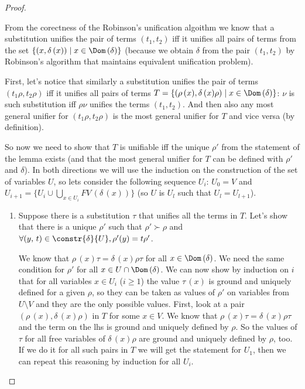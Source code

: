 \begin{proof} $ $

From the corectness of the Robinson's unification algoithm we know that a substitution unifies the pair of terms $(t_1, t_2)$ iff it unifies all pairs of terms from the set $\{ (x, \delta\,(x)) \mid x \in \Dom\,(\delta) \}$ (because we obtain $\delta$ from the pair $(t_1, t_2)$ by Robinson's algorithm that maintains equivalent unification problem).

First, let's notice that similarly a substitution unifies the pair of terms $(t_1 \rho, t_2 \rho)$ iff it unifies all pairs of terms  $T = \{ (\rho\,(x), \delta\,(x) \rho) \mid x \in \Dom\,(\delta) \}$: $\nu$ is such substitution iff $\rho \nu$ unifies the terms $(t_1, t_2)$. And then also any most general unifier for $(t_1 \rho, t_2 \rho)$ is the most general unifier for $T$ and vice versa (by definition).

So now we need to show that $T$ is unifiable iff the unique $\rho'$ from the statement of the lemma exists (and that the most general unifier for $T$ can be defined with $\rho'$ and $\delta$). In both directions we will use the induction on the construction of the set of variables $U$, so lets consider the following sequence $U_i$: $U_0 = V$ and $U_{i+1} = \{ U_i \cup \bigcup\limits_{x \in U_{i}} FV\,(\delta\,(x)) \}$ (so $U$ is $U_l$ such that $U_l = U_{l + 1}$).

\begin{enumerate}
\item Suppose there is a substitution $\tau$ that unifies all the terms in $T$. Let's show that there is a unique $\rho'$ such that $\rho' \succ \rho$ and $\forall (y, \, t) \in \constr{\delta}{U}, \\ \rho'(y) = t \rho'$.

We know that $\rho\,(x) \tau = \delta\,(x) \rho \tau$ for all $x \in \Dom\,(\delta)$. We need the same condition for $\rho'$ for all $x \in U \cap \Dom\,(\delta)$. We can now show by induction on $i$ that for all variables $x \in U_i$ ($i \ge 1$) the value $\tau\,(x)$ is ground and uniquely defined for a given $\rho$, so they can be taken as values of $\rho'$ on variables from $U \setminus V$ and they are the only possible values. First, look at a pair $(\rho\,(x), \delta\,(x) \rho)$ in $T$ for some $x \in V$. We know that $\rho\,(x) \tau = \delta\,(x) \rho \tau$ and the term on the lhs is ground and uniquely defined by $\rho$. So the values of $\tau$ for all free variables of $\delta\,(x) \rho$ are ground and uniquely defined by $\rho$, too. If we do it for all such pairs in $T$ we will get the statement for $U_1$, then we can repeat this reasoning by induction for all $U_i$.


\end{enumerate}
\end{proof}

